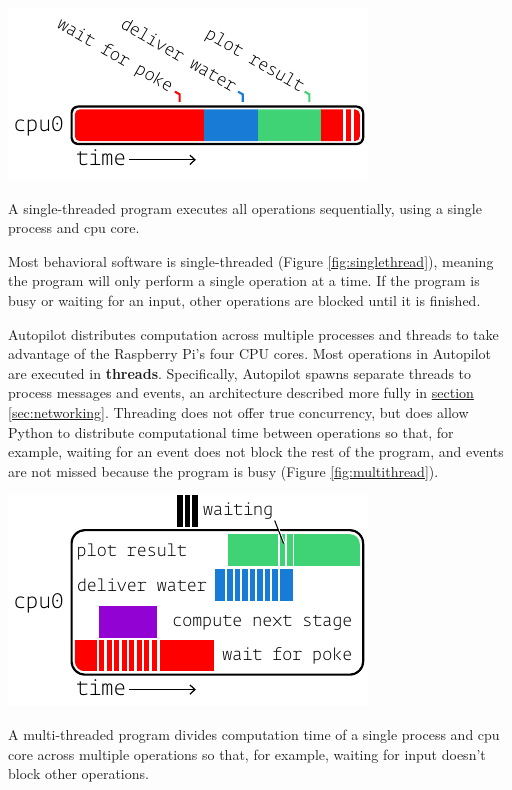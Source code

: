 \begin{marginfigure}[2cm]
\includegraphics[]{figures/side_12_onethread.pdf}
\caption{A single-threaded program executes all operations sequentially, using a single process and cpu core.}
\label{fig:singlethread}
\end{marginfigure}

Most behavioral software is single-threaded (Figure \ref{fig:singlethread}), meaning the program will only perform a single operation at a time. If the program is busy or waiting for an input, other operations are blocked until it is finished.

Autopilot distributes computation across multiple processes and threads to take advantage of the Raspberry Pi's four CPU cores. Most operations in Autopilot are executed in \textbf{threads}. Specifically, Autopilot spawns separate threads to process messages and events, an architecture described more fully in \hyperref[sec:networking]{section \ref*{sec:networking}}. Threading does not offer true concurrency, but does allow Python to distribute computational time between operations so that, for example, waiting for an event does not block the rest of the program, and events are not missed because the program is busy (Figure \ref{fig:multithread}).

\begin{marginfigure}[0.25cm]
\includegraphics[]{figures/side_13_multithread.pdf}
\caption{A multi-threaded program divides computation time of a single process and cpu core across multiple operations so that, for example, waiting for input doesn't block other operations.}
\label{fig:multithread}
\end{marginfigure}

